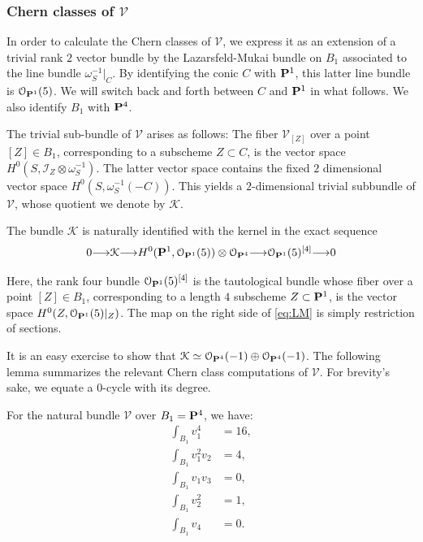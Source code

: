 \documentclass[12pt,reqno]{amsart}
\renewcommand{\to}{{\longrightarrow}}
\numberwithin{equation}{section}
\renewcommand{\O}{\mathcal O}
\newcommand{\V}{\mathcal V}
\begin{document}
\subsubsection{Chern classes of $\V$}
\label{sec:chern-classes-b_1}

In order to calculate the Chern classes of $\V$, we express it as an
extension of a trivial rank $2$ vector bundle by the Lazarsfeld-Mukai
bundle on $B_1$ associated to the line bundle
$\omega_{S}^{-1}|_{C}$. By identifying the conic $C$ with $\P^{1}$,
this latter line bundle is $\O_{\P^{1}}(5)$.  We will switch back and
forth between $C$ and $\P^{1}$ in what follows.  We also identify
$B_{1}$ with $\P^{4}$.


The trivial sub-bundle of $\V$ arises as follows: The fiber $\V_{[Z]}$
over a point $[Z] \in B_1$, corresponding to a subscheme
$Z \subset C$, is the vector space
$H^{0}(S, \mathcal{I}_{Z} \otimes \omega_{S}^{-1})$.  The latter
vector space contains the fixed $2$ dimensional vector space
$H^{0}(S, \omega_{S}^{-1}(-C))$.  This yields a $2$-dimensional
trivial subbundle of $\V$, whose quotient we denote by $\mathcal{K}$.


The bundle $\mathcal{K}$ is naturally identified with the kernel in
the exact sequence
\begin{align}
  \label{eq:LM}
  0 \to \mathcal{K} \to H^{0}(\P^1, \O_{\P^{1}}(5)) \otimes \O_{\P^4} \to \O_{\P^{1}}(5)^{[4]} \to 0 
\end{align}

Here, the rank four bundle $\O_{\P^{1}}(5)^{[4]}$ is the tautological
bundle whose fiber over a point $[Z] \in B_{1}$, corresponding to a
length $4$ subscheme $Z \subset \P^{1}$, is the vector space
$H^{0}(Z, \O_{\P^{1}}(5)|_{Z})$.  The map on the right side of
\eqref{eq:LM} is simply restriction of sections.

It is an easy exercise to show that
$\mathcal{K} \simeq \O_{\P^{4}}(-1) \oplus \O_{\P^{4}}(-1)$.  The
following lemma summarizes the relevant Chern class computations of
$\V$. For brevity's sake, we equate a $0$-cycle with its degree.

\begin{lemma}
  \label{lemma:chernB1}
  For the natural bundle $\V$ over $B_1= \P^{4}$, we have:
  \begin{align}\nonumber
    \int_{B_{1}}v_{1}^{4} &= 16,\\\nonumber
    \int_{B_{1}}v_{1}^{2}v_{2} &= 4,\\\nonumber
    \int_{B_{1}}v_{1}v_{3} &=0,\\\nonumber
    \int_{B_{1}}v_2^{2} &= 1,\\\nonumber
    \int_{B_{1}}v_{4} &= 0.
  \end{align}
\end{lemma}
\end{document}
